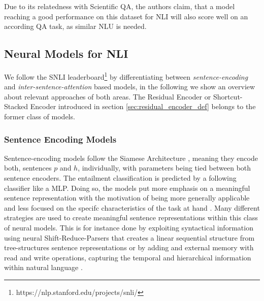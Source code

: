 Due to its relatedness with Scientific \ac{QA}, the authors claim, that a model reaching a good performance on this dataset for \ac{NLI} will also score well on an according \ac{QA} task, as similar \ac{NLU} is needed.
\subsection{Neural Models for NLI}\label{sec:models_snli}
We follow the \ac{SNLI} leaderboard\footnote{https://nlp.stanford.edu/projects/snli/} by differentiating between \textit{sentence-encoding} and \textit{inter-sentence-attention} based models, in the following we show an overview about relevant approaches of both areas. The Residual Encoder or Shortcut-Stacked Encoder introduced in section \ref{sec:residual_encoder_def} belongs to the former class of models. 
\subsubsection{Sentence Encoding Models}
Sentence-encoding models follow the Siamese Architecture \citep{bromley1994signature}, meaning they encode both, sentences $p$ and $h$, individually, with parameters being tied between both sentence encoders. The entailment classification is predicted by a following classifier like a \ac{MLP}. Doing so, the models put more emphasis on a meaningful sentence representation with the motivation of being more generally applicable and less focused on the specifc characteristics of the task at hand \citep{bowman2016fast}. Many different strategies are used to create meaningful sentence representations within this class of neural models. This is for instance done by exploiting syntactical information using neural Shift-Reduce-Parsers that creates a linear sequential structure from tree-structures sentence representations \citep{bowman2016fast} or by adding and external memory with read and write operations, capturing the temporal and hierarchical information within natural language \citep{munkhdalai2017neural}. 

